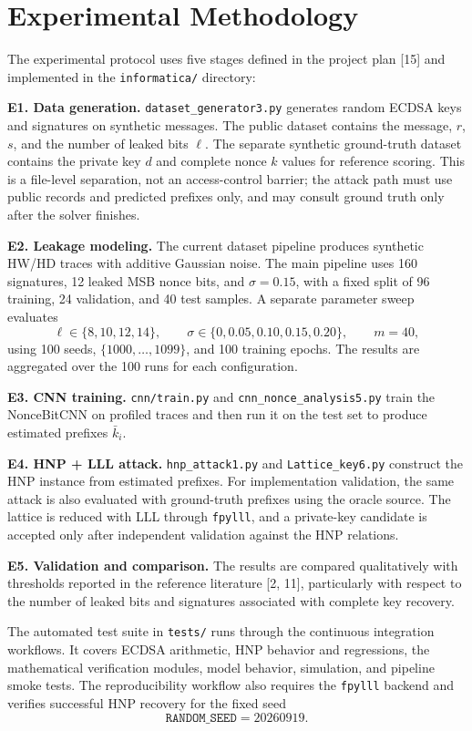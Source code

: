 \documentclass[11pt,a4paper]{article}
\begin{document}
\section{Experimental Methodology}

The experimental protocol uses five stages defined in the project plan [15] and implemented in the \texttt{informatica/} directory:

\textbf{E1. Data generation.}
\texttt{dataset\_generator3.py} generates random ECDSA keys and signatures on synthetic messages. The public dataset contains the message, $r$, $s$, and the number of leaked bits $\ell$. The separate synthetic ground-truth dataset contains the private key $d$ and complete nonce $k$ values for reference scoring. This is a file-level separation, not an access-control barrier; the attack path must use public records and predicted prefixes only, and may consult ground truth only after the solver finishes.

\textbf{E2. Leakage modeling.}
The current dataset pipeline produces synthetic HW/HD traces with additive Gaussian noise. The main pipeline uses 160 signatures, 12 leaked MSB nonce bits, and $\sigma=0.15$, with a fixed split of 96 training, 24 validation, and 40 test samples. A separate parameter sweep evaluates
\[
\ell\in\{8,10,12,14\},\qquad
\sigma\in\{0,0.05,0.10,0.15,0.20\},\qquad
m=40,
\]
using 100 seeds, $\{1000,\ldots,1099\}$, and 100 training epochs. The results are aggregated over the 100 runs for each configuration.

\textbf{E3. CNN training.}
\texttt{cnn/train.py} and \texttt{cnn\_nonce\_analysis5.py} train the NonceBitCNN on profiled traces and then run it on the test set to produce estimated prefixes $\bar{k}_i$.

\textbf{E4. HNP + LLL attack.}
\texttt{hnp\_attack1.py} and \texttt{Lattice\_key6.py} construct the HNP instance from estimated prefixes. For implementation validation, the same attack is also evaluated with ground-truth prefixes using the oracle source. The lattice is reduced with LLL through \texttt{fpylll}, and a private-key candidate is accepted only after independent validation against the HNP relations.

\textbf{E5. Validation and comparison.}
The results are compared qualitatively with thresholds reported in the reference literature [2, 11], particularly with respect to the number of leaked bits and signatures associated with complete key recovery.

The automated test suite in \texttt{tests/} runs through the continuous integration workflows. It covers ECDSA arithmetic, HNP behavior and regressions, the mathematical verification modules, model behavior, simulation, and pipeline smoke tests. The reproducibility workflow also requires the \texttt{fpylll} backend and verifies successful HNP recovery for the fixed seed
\[
\texttt{RANDOM\_SEED}=20260919.
\]
\end{document}
